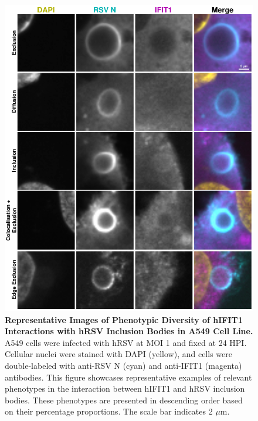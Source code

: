 \begin{figure}
    \label{fig:Phenotypic Diversity of hIFIT1 Interactions with hRSV Inclusion Bodies in A549 Cell Line}
\end{figure}

\begin{figure}
    \centering
    \includegraphics[width=1\linewidth]{08. Chapter 3/Figs/02. Infection/01. IFIT1/03. a549 i1.pdf}
    \caption[Representative Images of Phenotypic Diversity of hIFIT1 Interactions with hRSV Inclusion Bodies in A549 Cell Line.]{\textbf{Representative Images of Phenotypic Diversity of hIFIT1 Interactions with hRSV Inclusion Bodies in A549 Cell Line.} A549 cells were infected with hRSV at MOI 1 and fixed at 24 HPI. Cellular nuclei were stained with DAPI (yellow), and cells were double-labeled with anti-RSV N (cyan) and anti-IFIT1 (magenta) antibodies. This figure showcases representative examples of relevant phenotypes in the interaction between hIFIT1 and hRSV inclusion bodies. These phenotypes are presented in descending order based on their percentage proportions. The scale bar indicates 2 \(\mu \mbox{m}\).}
    \label{fig:Representative Images of Phenotypic Diversity of hIFIT1 Interactions with hRSV Inclusion Bodies in A549 Cell Line}
\end{figure}


